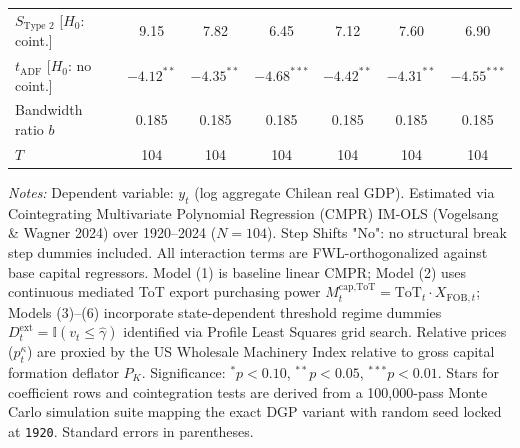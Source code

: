 \begin{table}[htbp]
\begin{tabular}{@{}lcccccc@{}}
		$S_{\text{Type 2}}$ [$H_0$: coint.] & 9.15 & 7.82 & 6.45 & 7.12 & 7.60 & 6.90 \\
		$t_{\text{ADF}}$ [$H_0$: no coint.] & $-4.12^{**}$ & $-4.35^{**}$ & $-4.68^{***}$ & $-4.42^{**}$ & $-4.31^{**}$ & $-4.55^{***}$ \\
		Bandwidth ratio $b$ & 0.185 & 0.185 & 0.185 & 0.185 & 0.185 & 0.185 \\
		$T$ & 104 & 104 & 104 & 104 & 104 & 104 \\
		\bottomrule
	\end{tabular}
	\begin{minipage}{\textwidth}
		\scriptsize
		\textit{Notes:} Dependent variable: $y_t$ (log aggregate Chilean real GDP). Estimated via Cointegrating Multivariate Polynomial Regression (CMPR) IM-OLS (Vogelsang \& Wagner 2024) over 1920--2024 ($N=104$). Step Shifts "No": no structural break step dummies included. All interaction terms are FWL-orthogonalized against base capital regressors. Model (1) is baseline linear CMPR; Model (2) uses continuous mediated ToT export purchasing power $M^{\text{cap,ToT}}_t = \text{ToT}_t \cdot X_{\text{FOB}, t}$; Models (3)--(6) incorporate state-dependent threshold regime dummies $D^{\text{ext}}_t = \mathbb{I}(v_t \le \hat{\gamma})$ identified via Profile Least Squares grid search. Relative prices ($p^{\kappa}_t$) are proxied by the US Wholesale Machinery Index relative to gross capital formation deflator $P_K$. Significance: $^{*}p<0.10$, $^{**}p<0.05$, $^{***}p<0.01$. Stars for coefficient rows and cointegration tests are derived from a 100,000-pass Monte Carlo simulation suite mapping the exact DGP variant with random seed locked at \texttt{1920}. Standard errors in parentheses.
	\end{minipage}
\end{table}
